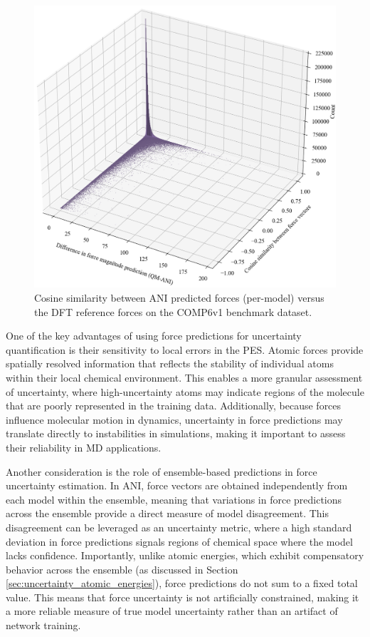 \begin{figure}[H]
    \centering
    \includegraphics[width=1\linewidth]{Images/2xr_forces/2xr_comp6v1_force-cosine_sim-bar3d.png}
    \caption[3D histogram of cosine similarity measure of predicted atomic force vectors]{
    Cosine similarity between ANI predicted forces (per-model) versus the DFT reference forces on the COMP6v1 benchmark dataset.
    }
    \label{fig:2xr_comp6v1-forces-cos_sim}
\end{figure}

One of the key advantages of using force predictions for uncertainty quantification is their sensitivity to local errors in the PES. 
Atomic forces provide spatially resolved information that reflects the stability of individual atoms within their local chemical environment. 
This enables a more granular assessment of uncertainty, where high-uncertainty atoms may indicate regions of the molecule that are poorly represented in the training data. 
Additionally, because forces influence molecular motion in dynamics, uncertainty in force predictions may translate directly to instabilities in simulations, making it important to assess their reliability in MD applications.

Another consideration is the role of ensemble-based predictions in force uncertainty estimation. In ANI, force vectors are obtained independently from each model within the ensemble, meaning that variations in force predictions across the ensemble provide a direct measure of model disagreement. This disagreement can be leveraged as an uncertainty metric, where a high standard deviation in force predictions signals regions of chemical space where the model lacks confidence. Importantly, unlike atomic energies, which exhibit compensatory behavior across the ensemble (as discussed in Section \ref{sec:uncertainty_atomic_energies}), force predictions do not sum to a fixed total value. This means that force uncertainty is not artificially constrained, making it a more reliable measure of true model uncertainty rather than an artifact of network training.

